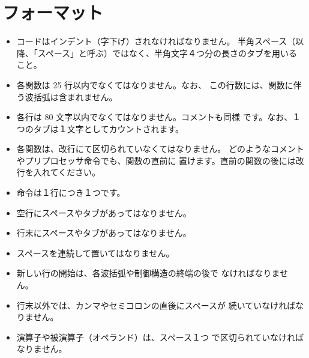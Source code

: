 \documentclass{42-ja}
\begin{document}
    \section{フォーマット}

            \begin{itemize}

                \item コードはインデント（字下げ）されなければなりません。
					半角スペース（以降、「スペース」と呼ぶ）ではなく、半角文字４つ分の長さのタブを用いること。

                \item 各関数は 25 行以内でなくてはなりません。なお、
					この行数には、関数に伴う波括弧は含まれません。

                \item 各行は 80 文字以内でなくてはなりません。コメントも同様
					です。なお、１つのタブは１文字としてカウントされます。

                \item 各関数は、改行にて区切られていなくてはなりません。
					どのようなコメントやプリプロセッサ命令でも、関数の直前に
					置けます。直前の関数の後には改行を入れてください。

                \item 命令は１行につき１つです。

				\item 空行にスペースやタブがあってはなりません。

				\item 行末にスペースやタブがあってはなりません。

                \item スペースを連続して置いてはなりません。

                \item 新しい行の開始は、各波括弧や制御構造の終端の後で
					なければなりません。

                \item 行末以外では、カンマやセミコロンの直後にスペースが
					続いていなければなりません。

                \item 演算子や被演算子（オペランド）は、スペース１つ
					で区切られていなければなりません。


\end{itemize}
\end{document}
